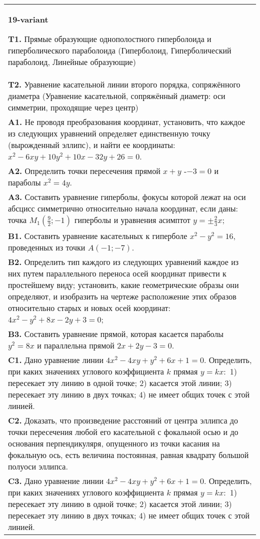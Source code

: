 \documentclass{article}
\begin{document}
\begin{tabular}{m{17cm}}
\textbf{19-variant}
\newline

\textbf{T1.} Прямые образующие однополостного гиперболоида и гиперболического параболоида (Гиперболоид, Гиперболический параболоид, Линейные образующие) \\
\textbf{T2.} Уравнение касательной линии второго порядка, сопряжённого диаметра (Уравнение касательной, сопряжённый диаметр: оси симметрии, проходящие через центр) \\
\textbf{A1.} Не проводя преобразования координат, установить, что каждое из следующих уравнений определяет единственную точку (вырожденный эллипс), и найти ее координаты: $x^2-6 x y+10 y^2+10 x-32 y+26=0$. \\
\textbf{A2.} Определить точки пересечения прямой $x+y$ -$-3=0$ и параболы $x^2=4 y$. \\
\textbf{A3.} Составить уравнение гиперболы, фокусы которой лежат на оси абсцисс симметрично относительно начала координат, если даны: точка $M_1\left(\frac{9}{2} ;-1\right)$ гиперболы и уравнения асимптот $y= \pm \frac{2}{3} x$; \\
\textbf{B1.} Составить уравнение касательных к гиперболе $x^2-y^2=16$, проведенных из точки $A(-1 ;-7)$. \\
\textbf{B2.} Определить тип каждого из следующих уравнений каждое из них путем параллельного переноса осей координат привести к простейшему виду; установить, какие геометрические образы они определяют, и изобразить на чертеже расположение этих образов относительно старых и новых осей координат: $4 x^2-y^2+8 x-2 y+3=0$; \\
\textbf{B3.} Составить уравнение прямой, которая касается параболы $y^2=8 x$ и параллельна прямой $2 x+2 y-3=0$. \\
\textbf{C1.} Дано уравнение линии $4 x^2-4 x y+y^2+6 x+1=0$. Определить, при каких значениях углового коэффициента $k$ прямая $y=k x:$ 1) пересекает эту линию в одной точке; 2) касается этой линии; 3) пересекает эту линию в двух точках; 4) не имеет общих точек с этой линией. \\
\textbf{C2.} Доказать, что произведение расстояний от центра эллипса до точки пересечения любой его касательной с фокальной осью и до основания перпендикуляря, опущенного из точки касания на фокальную ось, есть величина постоянная, равная квадрату большой полуоси эллипса. \\
\textbf{C3.} Дано уравнение линии $4 x^2-4 x y+y^2+6 x+1=0$. Определить, при каких значениях углового коэффициента $k$ прямая $y=k x:$ 1) пересекает эту линию в одной точке; 2) касается этой линии; 3) пересекает эту линию в двух точках; 4) не имеет общих точек с этой линией. \\

\end{tabular}
\vspace{1cm}
\end{document}
